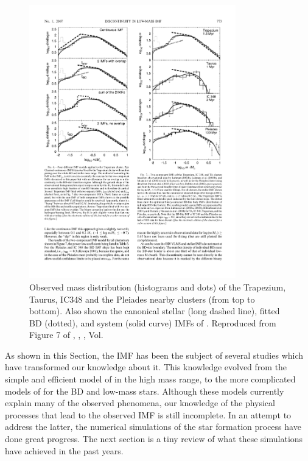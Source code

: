  \begin{figure}[htbp]
\begin{center}
\includegraphics[width=0.8\textwidth]{background/Figures/F7_Thies2007.pdf}
\caption{Observed mass distribution (histograms and dots) of the Trapezium, Taurus, IC348 and the Pleiades nearby clusters (from top to bottom). Also shown the canonical stellar (long dashed line), fitted BD (dotted), and system (solid curve) IMFs of \citet{Thies2007} . Reproduced from Figure 7 of \citet{Thies2007}, \textit{}, , Vol. }
\label{fig:IMFThies2007}
\end{center}
\end{figure}
 
As shown in this Section, the IMF has been the subject of several studies which have transformed our knowledge about it. This knowledge evolved from the simple and efficient model of \citet{Salpeter1955} in the high mass range, to the more complicated models of \citet{Thies2007, 2013pss5.book..115K} for the BD and low-mass stars. Although these models currently explain many of the observed phenomena, our knowledge of the physical processes that lead to the observed IMF is still incomplete. In an attempt to address the latter, the numerical simulations of the star formation process have done great progress. The next section is a tiny review of what these simulations have achieved in the past years.


